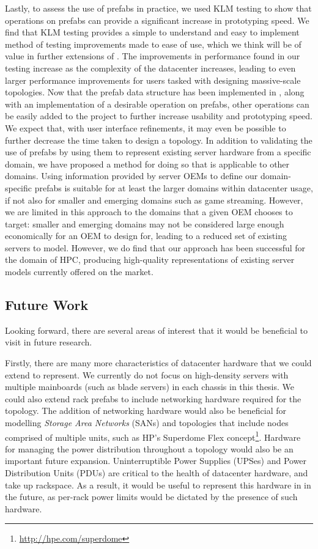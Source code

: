 \documentclass[11pt]{article}
\begin{document}
		Lastly, to assess the use of prefabs in practice, we used KLM testing to show that operations on prefabs can provide a significant increase in prototyping speed.
		We find that KLM testing provides a simple to understand and easy to implement method of testing improvements made to ease of use, which we think will be of value in further extensions of \opendc{}.
		The improvements in performance found in our testing increase as the complexity of the datacenter increases, leading to even larger performance improvements for users tasked with designing massive-scale topologies.
		Now that the prefab data structure has been implemented in \opendc{}, along with an implementation of a desirable operation on prefabs, other operations can be easily added to the project to further increase usability and prototyping speed.
		We expect that, with user interface refinements, it may even be possible to further decrease the time taken to design a topology.
		In addition to validating the use of prefabs by using them to represent existing server hardware from a specific domain, we have proposed a method for doing so that is applicable to other domains.
		Using information provided by server OEMs to define our domain-specific prefabs is suitable for at least the larger domains within datacenter usage, if not also for smaller and emerging domains such as game streaming.
		However, we are limited in this approach to the domains that a given OEM chooses to target: smaller and emerging domains may not be considered large enough economically for an OEM to design for, leading to a reduced set of existing servers to model.
		However, we do find that our approach has been successful for the domain of HPC, producing high-quality representations of existing server models currently offered on the market.


	\subsection{Future Work} \label{sec:future-work}
		Looking forward, there are several areas of interest that it would be beneficial to visit in future research.

		Firstly, there are many more characteristics of datacenter hardware that we could extend \opendc{} to represent. 
		We currently do not focus on high-density servers with multiple mainboards (such as blade servers) in each chassis in this thesis. 
		We could also extend rack prefabs to include networking hardware required for the topology. 
		The addition of networking hardware would also be beneficial for modelling \textit{Storage Area Networks} (SANs) and topologies that include nodes comprised of multiple units, such as HP's Superdome Flex concept\footnote{\url{http://hpe.com/superdome}}.
		Hardware for managing the power distribution throughout a topology would also be an important future expansion.
		Uninterruptible Power Supplies (UPSes) and Power Distribution Units (PDUs) are critical to the health of datacenter hardware, and take up rackspace.
		As a result, it would be useful to represent this hardware in \opendc{} in the future, as per-rack power limits would be dictated by the presence of such hardware.
\end{document}
